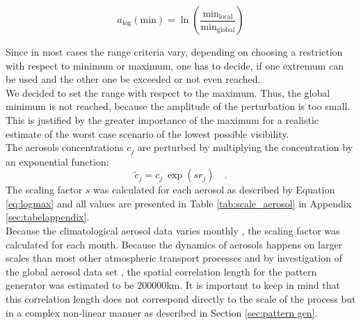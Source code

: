 \begin{equation}
a_{\mathrm{log}}(\mathrm{min}) = \ln \left( \frac{\mathrm{min_{local}}}{\mathrm{min_{global}}} \right)
\end{equation}

Since in most cases the range criteria vary, depending on choosing a restriction with respect to minimum or maximum, one has to decide, if one extremum can be used and the other one be exceeded or not even reached.\\
We decided to set the range with respect to the maximum. Thus, the global minimum is not reached, because the amplitude of the perturbation is too small. This is justified by the greater importance of the maximum for a realistic estimate of the worst case scenario of the lowest possible visibility.\\

The aerosols concentrations $c_{j}$ are perturbed by multiplying the concentration by an exponential function: 
\begin{equation}
    \tilde{c}_{j} = c_{j} \ \exp(sr_{j})  \quad .
    \label{eq:aerpert}
\end{equation}
The scaling factor $s$ was calculated for each aerosol as described by Equation \eqref{eq:logmax} and all values are presented in Table \ref{tab:scale_aerosol} in Appendix \ref{sec:tabelappendix}. \\
Because the climatological aerosol data varies monthly \cite{nasa}, the scaling factor was calculated for each month. Because the dynamics of aerosols happens on larger scales than most other atmospheric transport processes and by investigation of the global aerosol data set \cite{nasa}, the spatial correlation length for the pattern generator was estimated to be 200000km. It is important to keep in mind that this correlation length does not correspond directly to the scale of the process but in a complex non-linear manner as described in Section \ref{sec:pattern gen}.

